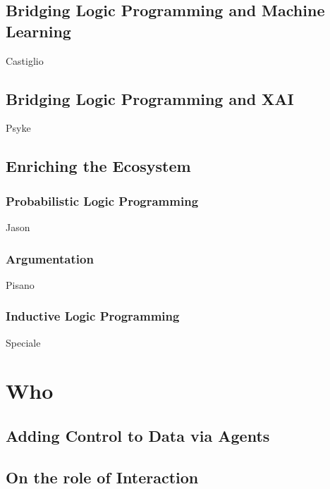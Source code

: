 \documentclass[12pt,a4paper,openright,twoside]{book}
\begin{document}
\cite{cco-softwarex-2021-2pkt}
\cite{kotlindsi4prolog-woa2020}

\chapter{Bridging Logic Programming and Machine Learning}

Castiglio

\chapter{Bridging Logic Programming and XAI}

Psyke

\chapter{Enriching the Ecosystem}

\section{Probabilistic Logic Programming}

Jason

\section{Argumentation}

Pisano

\section{Inductive Logic Programming}

Speciale

\part{Who}
\label{part:who}

\cite{imagination-extraamas2021}
\cite{expectation-extraamas2021}

\chapter{Adding Control to Data via Agents}

\chapter{On the role of Interaction}
\end{document}
